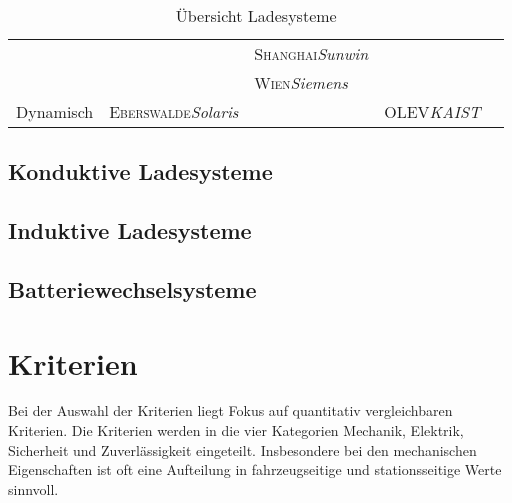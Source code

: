 \documentclass{scrreprt}
\begin{document}
\begin{table}[htbp]
\begin{tabularx}{\linewidth}{lp{2.1cm}p{2.1cm}XX}
		                           &                                           & \textsc{Shanghai}\newline\emph{Sunwin} &                                       &  \\
		                           &                                           & \textsc{Wien}\newline\emph{Siemens}    &                                       &  \\ \midrule
		\multirow{2}{*}{Dynamisch} & \textsc{Eberswalde}\newline\emph{Solaris} &                                        & OLEV\newline\emph{KAIST}              &  \\ \bottomrule
	\end{tabularx}
	\caption{Übersicht Ladesysteme}
	\label{übersichtLadesysteme}
\end{table}

\subsection{Konduktive Ladesysteme}

\subsection{Induktive Ladesysteme}

\subsection{Batteriewechselsysteme}

\section{Kriterien}
Bei der Auswahl der Kriterien liegt Fokus auf quantitativ vergleichbaren Kriterien. Die Kriterien werden in die vier Kategorien Mechanik, Elektrik, Sicherheit und Zuverlässigkeit eingeteilt. Insbesondere bei den mechanischen Eigenschaften ist oft eine Aufteilung in fahrzeugseitige und stationsseitige Werte sinnvoll.
\end{document}
